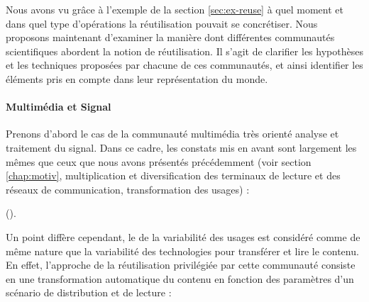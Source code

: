 


Nous avons vu grâce à l'exemple de la section \ref{sec:ex-reuse} à quel moment et dans quel type d'opérations la réutilisation pouvait se concrétiser. 
Nous proposons maintenant d'examiner la manière dont différentes communautés scientifiques  abordent la notion de réutilisation. 
Il s'agit de clarifier les hypothèses et les techniques proposées par chacune de ces communautés, et ainsi identifier les éléments pris en compte dans leur représentation du monde.  %

\paragraph{Multimédia et Signal}
Prenons d'abord le cas de la communauté multimédia très orienté analyse et traitement du signal. 
Dans ce cadre, les constats mis en avant sont largement les mêmes que ceux que nous avons présentés précédemment (voir section \ref{chap:motiv}, multiplication et diversification des terminaux de lecture et des réseaux de communication, transformation des usages) :
 
 (\cite{Singh2004}).

Un point diffère cependant, le  de la variabilité des usages est considéré comme de même nature que la variabilité des technologies pour transférer et lire le contenu. 
En effet, l'approche de la réutilisation privilégiée par cette communauté consiste en une transformation automatique du contenu en fonction des paramètres d'un scénario de distribution et de lecture : 

